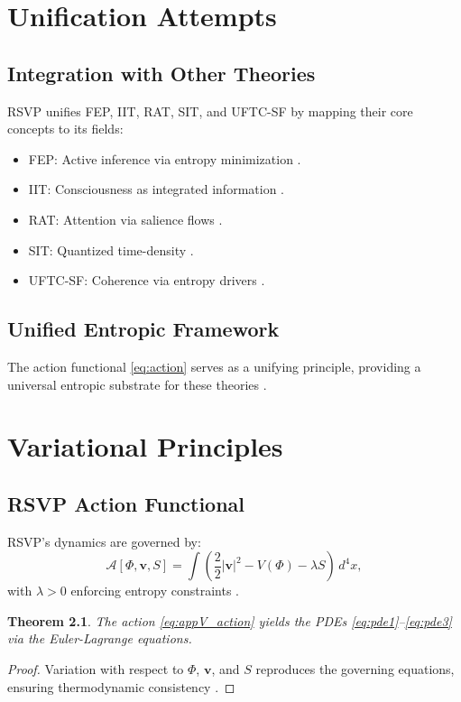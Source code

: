 \documentclass[12pt]{report}
\newtheorem{theorem}{Theorem}[chapter]
\newcommand{\PhiRSVP}{\Phi}
\newcommand{\vRSVP}{\mathbf{v}}
\newcommand{\SRSVP}{S}
\begin{document}
\chapter{Unification Attempts}
\label{app:U}
\section{Integration with Other Theories}
RSVP unifies FEP, IIT, RAT, SIT, and UFTC-SF by mapping their core concepts to its fields:
\begin{itemize}
    \item FEP: Active inference via entropy minimization \citep{Friston2010}.
    \item IIT: Consciousness as integrated information \citep{Tononi2016}.
    \item RAT: Attention via salience flows \citep{RAT2025}.
    \item SIT: Quantized time-density \citep{Blumberg2025}.
    \item UFTC-SF: Coherence via entropy drivers \citep{Logan2025}.
\end{itemize}

\section{Unified Entropic Framework}
The action functional \eqref{eq:action} serves as a unifying principle, providing a universal entropic substrate for these theories \citep{RSVPMeta2025}.

\chapter{Variational Principles}
\label{app:V}
\section{RSVP Action Functional}
RSVP’s dynamics are governed by:
\begin{equation}
\mathcal{A}[\PhiRSVP, \vRSVP, \SRSVP] = \int \left( \frac{2}{2} |\vRSVP|^2 - V(\PhiRSVP) - \lambda \SRSVP \right) \, d^4x, \label{eq:appV_action}
\end{equation}
with \(\lambda > 0\) enforcing entropy constraints \citep{RSVPMeta2025}.

\begin{theorem}
The action \eqref{eq:appV_action} yields the PDEs \eqref{eq:pde1}--\eqref{eq:pde3} via the Euler-Lagrange equations.
\end{theorem}
\begin{proof}
Variation with respect to \(\PhiRSVP\), \(\vRSVP\), and \(\SRSVP\) reproduces the governing equations, ensuring thermodynamic consistency \citep{Goldstein2002}.
\end{proof}
\end{document}

